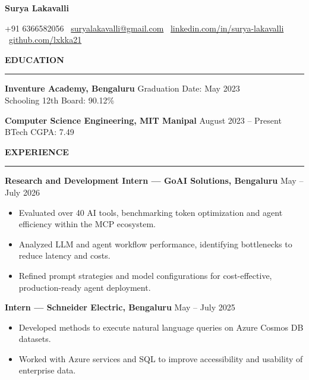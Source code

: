 \documentclass[10.5pt]{article}
\newcommand{\sectionheader}[1]{
  \vspace{4pt}
  {\color{accent}\textbf{\large #1}}
  \par\vspace{1pt}
  {\color{accent}\hrule}
  \vspace{3pt}
}
\begin{document}
\vspace*{2pt}

\begin{center}
    \textbf{\LARGE\color{accent} Surya Lakavalli}\\ 
    \color{accent}\hrulefill
\end{center}

\begin{center}
    +91 6366582056 \textbullet \ 
    \href{mailto:suryalakavalli@gmail.com}{suryalakavalli@gmail.com} \textbullet \ 
    \href{https://www.linkedin.com/in/surya-lakavalli-4901b4a9/}{linkedin.com/in/surya-lakavalli} \textbullet \ 
    \href{https://github.com/lxkka21}{github.com/lxkka21}
\end{center}

\sectionheader{EDUCATION}

\textbf{Inventure Academy, Bengaluru} \hfill Graduation Date: May 2023 \\
Schooling \hfill 12th Board: 90.12\%

\vspace{4pt}

\textbf{Computer Science Engineering, MIT Manipal} \hfill August 2023 -- Present \\
BTech \hfill CGPA: 7.49

\sectionheader{EXPERIENCE}

\textbf{Research and Development Intern --- GoAI Solutions, Bengaluru} \hfill May -- July 2026
\begin{itemize}[noitemsep, topsep=1pt]
\item Evaluated over 40 AI tools, benchmarking token optimization and agent efficiency within the MCP ecosystem.
\item Analyzed LLM and agent workflow performance, identifying bottlenecks to reduce latency and costs.
\item Refined prompt strategies and model configurations for cost-effective, production-ready agent deployment.
\end{itemize}

\vspace{2pt}

\textbf{Intern --- Schneider Electric, Bengaluru} \hfill May -- July 2025
\begin{itemize}[noitemsep, topsep=1pt]
\item Developed methods to execute natural language queries on Azure Cosmos DB datasets.
\item Worked with Azure services and SQL to improve accessibility and usability of enterprise data.
\end{itemize}
\end{document}
